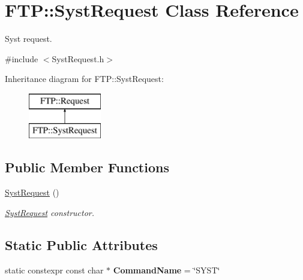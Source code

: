 \hypertarget{classFTP_1_1SystRequest}{}\section{F\+T\+P\+:\+:Syst\+Request Class Reference}
\label{classFTP_1_1SystRequest}


Syst request.  




{\ttfamily \#include $<$Syst\+Request.\+h$>$}

Inheritance diagram for F\+T\+P\+:\+:Syst\+Request\+:\begin{figure}[H]
\begin{center}
\leavevmode
\includegraphics[height=2.000000cm]{classFTP_1_1SystRequest}
\end{center}
\end{figure}
\subsection*{Public Member Functions}
\begin{DoxyCompactItemize}
\item 
\hypertarget{classFTP_1_1SystRequest_aefe3807c83831af30762ec46f83743af}{}\hyperlink{classFTP_1_1SystRequest_aefe3807c83831af30762ec46f83743af}{Syst\+Request} ()\label{classFTP_1_1SystRequest_aefe3807c83831af30762ec46f83743af}

\begin{DoxyCompactList}\small\item\em \hyperlink{classFTP_1_1SystRequest}{Syst\+Request} constructor. \end{DoxyCompactList}\end{DoxyCompactItemize}
\subsection*{Static Public Attributes}
\begin{DoxyCompactItemize}
\item 
\hypertarget{classFTP_1_1SystRequest_a8342518a6ae8cc1f7de4aef78cbc345e}{}static constexpr const char $\ast$ {\bfseries Command\+Name} = \char`\"{}S\+Y\+S\+T\char`\"{}\label{classFTP_1_1SystRequest_a8342518a6ae8cc1f7de4aef78cbc345e}

\end{DoxyCompactItemize}


